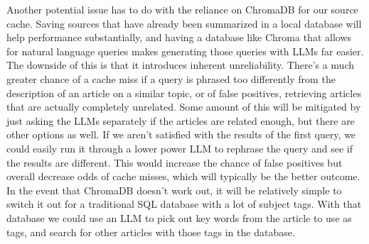 \documentclass[conference]{IEEEtran}
\begin{document}
Another potential issue has to do with the reliance on ChromaDB for our source cache. Saving sources that have already been summarized in a local database will help performance substantially, and having a database like Chroma that allows for natural language queries makes generating those queries with LLMs far easier. The downside of this is that it introduces inherent unreliability. There's a much greater chance of a cache miss if a query is phrased too differently from the description of an article on a similar topic, or of false positives, retrieving articles that are actually completely unrelated. Some amount of this will be mitigated by just asking the LLMs separately if the articles are related enough, but there are other options as well. If we aren't satisfied with the results of the first query, we could easily run it through a lower power LLM to rephrase the query and see if the results are different. This would increase the chance of false positives but overall decrease odds of cache misses, which will typically be the better outcome. In the event that ChromaDB doesn't work out, it will be relatively simple to switch it out for a traditional SQL database with a lot of subject tags. With that database we could use an LLM to pick out key words from the article to use as tags, and search for other articles with those tags in the database.





\end{document}
